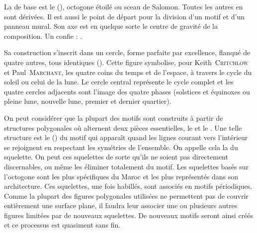 La \furma de base est le \hatim (), 
octogone étoilé ou sceau de Salomon. Toutes les autres 
\furmas en sont dérivées. Il est aussi le point de départ 
pour la division d'un motif et d'un panneau mural. Son axe est en 
quelque sorte le centre de gravité de la composition. Un \zlaygi 
confie :  
\autocite{Castera_1996}.

Sa construction s'inscrit dans un cercle, forme parfaite 
par excellence, flanqué de quatre autres, tous identiques 
(). Cette figure symbolise, pour 
Keith~\textsc{Critchlow} et Paul~\textsc{Marchant}, les quatre coins 
du temps et de l'espace, à travers le cycle du soleil ou celui 
de la lune. Le cercle central représente le cycle complet et les 
quatre cercles adjacents sont l'image des quatre phases (solstices 
et équinoxes ou pleine lune, nouvelle lune, premier et dernier 
quartier).

On peut considérer que la plupart des motifs sont construits à partir 
de structures polygonales où alternent deux pièces essentielles, le 
\hatim et le \saft. Une telle structure est le  
() du motif qui apparaît quand les lignes courant 
vers l'intérieur se rejoignent en respectant les symétries de 
l'ensemble. On appelle cela la  du squelette. 
On peut  ces squelettes de sorte qu'ils ne soient 
pas directement discernables, ou même les éliminer totalement du 
motif. Les squelettes basés sur l'octogone sont les plus spécifiques 
du Maroc et les plus représentés dans son architecture. Ces 
squelettes, une fois habillés, sont associés en motifs périodiques. 
Comme la plupart des figures polygonales utilisées ne permettent pas 
de couvrir entièrement une surface plane, il faudra leur associer une 
ou plusieurs autres figures limitées par de nouveaux squelettes. De 
nouveaux motifs seront ainsi créés et ce processus est quasiment sans 
fin.

